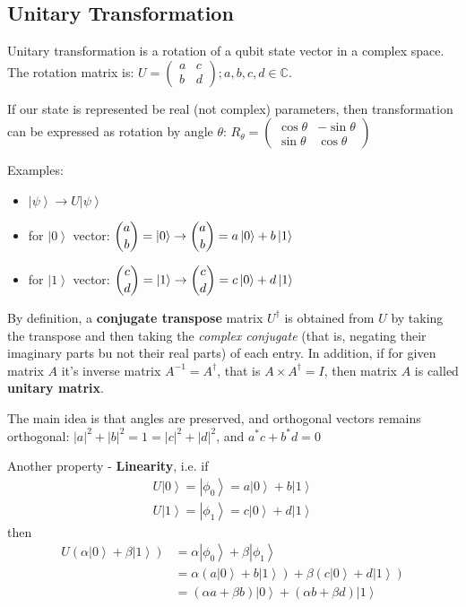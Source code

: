 \documentclass{scrartcl}
\newcommand{\cplx}{\mathbb{C}} %
\newcommand{\ket}[1]{\left| #1 \right>} %
\begin{document}
\subsection{Unitary Transformation}
\label{sec:5-3}

Unitary transformation is a rotation of a qubit state vector in a complex space.
The rotation matrix is: $U = \begin{pmatrix} a & c \\ b & d \end{pmatrix}; a, b,
c, d \in \cplx$.

If our state is represented be real (not complex) parameters, then
transformation can be expressed as rotation by angle $\theta$: $R_\theta =
\begin{pmatrix} \cos \theta & -\sin\theta \\ \sin\theta &
  \cos\theta \end{pmatrix}$

Examples:
\begin{itemize}
\item $\ket\psi \to U\ket\psi$
\item for $\ket0$ vector: $ \dbinom{a}{b} = \ket0 \to \dbinom ab = a\ket0 + b
  \ket1$
\item for $\ket1$ vector: $ \dbinom{c}{d} =\ket1 \to \dbinom{c}{d} = c\ket0 + d
  \ket1$
\end{itemize}

By definition, a {\bf conjugate transpose} matrix $U^\dag$ is obtained from $U$
by taking the transpose and then taking the {\it complex conjugate} (that is,
negating their imaginary parts bu not their real parts) of each entry. In
addition, if for given matrix $A$ it's inverse matrix $A^{-1} = A^\dag$, that is
$A \times A^\dag = I$, then matrix $A$ is called {\bf unitary matrix}.

The main idea is that angles are preserved, and orthogonal vectors remains
orthogonal: $|a|^2 + |b|^2 = 1 = |c|^2 + |d|^2$, and $a^*c + b^*d = 0$

Another property - {\bf Linearity}, i.e. if
\begin{gather*}
  U\ket0 = \ket{\phi_0} = a\ket0 + b \ket1 \\
  U\ket1 = \ket{\phi_1} = c\ket0 + d \ket1 \end{gather*} then
\[\begin{split}
  U(\alpha \ket0 + \beta \ket1) &= \alpha\ket{\phi_0} + \beta\ket{\phi_1} \\ &=
  \alpha (a\ket0 + b \ket1) + \beta (c\ket0 + d\ket1) \\ &= (\alpha a + \beta b)
  \ket0 + (\alpha b + \beta d) \ket1 \end{split}\]
\end{document}
